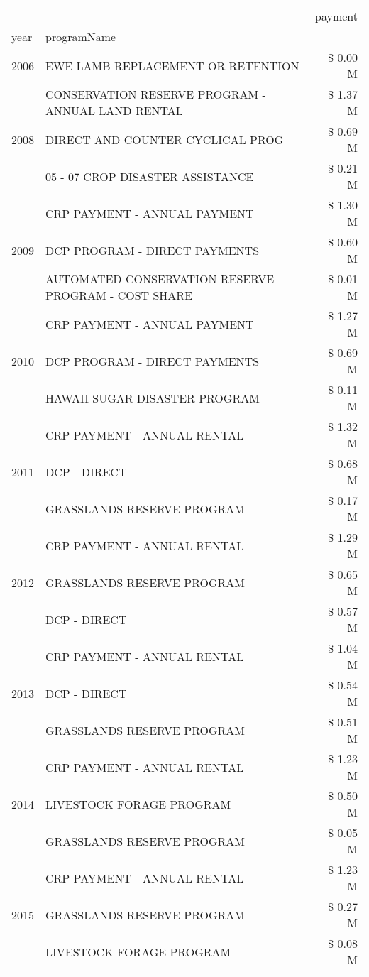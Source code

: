 \begin{tabular}{llr}
\toprule
 &  & payment \\
year & programName &  \\
\midrule
2006 & EWE LAMB REPLACEMENT OR RETENTION & \$ 0.00 M \\
\cline{1-3}
\multirow[t]{3}{*}{2008} & CONSERVATION RESERVE PROGRAM - ANNUAL LAND RENTAL & \$ 1.37 M \\
 & DIRECT AND COUNTER CYCLICAL PROG & \$ 0.69 M \\
 & 05 - 07 CROP DISASTER ASSISTANCE & \$ 0.21 M \\
\cline{1-3}
\multirow[t]{3}{*}{2009} & CRP PAYMENT - ANNUAL PAYMENT & \$ 1.30 M \\
 & DCP PROGRAM - DIRECT PAYMENTS & \$ 0.60 M \\
 & AUTOMATED CONSERVATION RESERVE PROGRAM - COST SHARE & \$ 0.01 M \\
\cline{1-3}
\multirow[t]{3}{*}{2010} & CRP PAYMENT - ANNUAL PAYMENT & \$ 1.27 M \\
 & DCP PROGRAM - DIRECT PAYMENTS & \$ 0.69 M \\
 & HAWAII SUGAR DISASTER PROGRAM & \$ 0.11 M \\
\cline{1-3}
\multirow[t]{3}{*}{2011} & CRP PAYMENT - ANNUAL RENTAL & \$ 1.32 M \\
 & DCP - DIRECT & \$ 0.68 M \\
 & GRASSLANDS RESERVE PROGRAM & \$ 0.17 M \\
\cline{1-3}
\multirow[t]{3}{*}{2012} & CRP PAYMENT - ANNUAL RENTAL & \$ 1.29 M \\
 & GRASSLANDS RESERVE PROGRAM & \$ 0.65 M \\
 & DCP - DIRECT & \$ 0.57 M \\
\cline{1-3}
\multirow[t]{3}{*}{2013} & CRP PAYMENT - ANNUAL RENTAL & \$ 1.04 M \\
 & DCP - DIRECT & \$ 0.54 M \\
 & GRASSLANDS RESERVE PROGRAM & \$ 0.51 M \\
\cline{1-3}
\multirow[t]{3}{*}{2014} & CRP PAYMENT - ANNUAL RENTAL & \$ 1.23 M \\
 & LIVESTOCK FORAGE PROGRAM & \$ 0.50 M \\
 & GRASSLANDS RESERVE PROGRAM & \$ 0.05 M \\
\cline{1-3}
\multirow[t]{3}{*}{2015} & CRP PAYMENT - ANNUAL RENTAL & \$ 1.23 M \\
 & GRASSLANDS RESERVE PROGRAM & \$ 0.27 M \\
 & LIVESTOCK FORAGE PROGRAM & \$ 0.08 M \\

\end{tabular}
